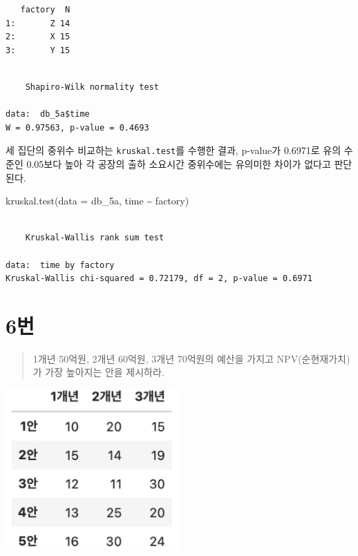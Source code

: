 \documentclass[
  letterpaper,
  DIV=11,
  numbers=noendperiod]{scrreprt}
\newenvironment{Shaded}{\begin{snugshade}}{\end{snugshade}}
\newcommand{\AttributeTok}[1]{\textcolor[rgb]{0.40,0.45,0.13}{#1}}
\newcommand{\FunctionTok}[1]{\textcolor[rgb]{0.28,0.35,0.67}{#1}}
\newcommand{\NormalTok}[1]{\textcolor[rgb]{0.00,0.23,0.31}{#1}}
\newcommand{\SpecialCharTok}[1]{\textcolor[rgb]{0.37,0.37,0.37}{#1}}
\begin{document}
\begin{verbatim}
   factory  N
1:       Z 14
2:       X 15
3:       Y 15
\end{verbatim}

\begin{Shaded}
\end{Shaded}

\begin{verbatim}

    Shapiro-Wilk normality test

data:  db_5a$time
W = 0.97563, p-value = 0.4693
\end{verbatim}

세 집단의 중위수 비교하는 \texttt{kruskal.test}를 수행한 결과, p-value가
0.6971로 유의 수준인 0.05보다 높아 각 공장의 출하 소요시간 중위수에는
유의미한 차이가 없다고 판단된다.

\begin{Shaded}
\begin{Highlighting}[]
\FunctionTok{kruskal.test}\NormalTok{(}\AttributeTok{data =}\NormalTok{ db\_5a, time }\SpecialCharTok{\textasciitilde{}}\NormalTok{ factory)}
\end{Highlighting}
\end{Shaded}

\begin{verbatim}

    Kruskal-Wallis rank sum test

data:  time by factory
Kruskal-Wallis chi-squared = 0.72179, df = 2, p-value = 0.6971
\end{verbatim}

\hypertarget{uxbc88-59}{%
\chapter*{6번}\label{uxbc88-59}}


\begin{quote}
1개년 50억원, 2개년 60억원, 3개년 70억원의 예산을 가지고
NPV(순현재가치)가 가장 높아지는 안을 제시하라.
\end{quote}

\includegraphics[width=0.5\textwidth,height=\textheight]{./test/25/problem6.png}
\end{document}
